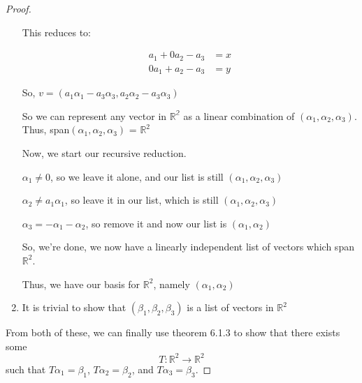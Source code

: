 \documentclass[12pt,letterpaper]{article}
\begin{document}
\begin{proof}
\begin{enumerate}
        This reduces to:

        \begin{align*}
          a_1 + 0a_2 - a_3 &= x \\
          0a_1 + a_2 - a_3 &= y
        \end{align*}

        So, $v = (a_1\alpha_1 - a_3\alpha_3, a_2\alpha_2 - a_3\alpha_3)$

        So we can represent any vector in $\mathbb{R^2}$ as a linear combination
        of $(\alpha_1, \alpha_2, \alpha_3)$.
        Thus, span$(\alpha_1, \alpha_2, \alpha_3)$ = $\mathbb{R}^2$

        Now, we start our recursive reduction.

        $\alpha_1 \neq 0$, so we leave it alone, and our list is still $(\alpha_1, \alpha_2, \alpha_3)$

        $\alpha_2 \neq a_1\alpha_1$, so leave it in our list, which is still $(\alpha_1, \alpha_2, \alpha_3)$

        $\alpha_3 = -\alpha_1 - \alpha_2$, so remove it and now our list is $(\alpha_1, \alpha_2)$

        So, we're done, we now have a linearly independent list of vectors which span $\mathbb{R}^2$.

        Thus, we have our basis for $\mathbb{R}^2$, namely $(\alpha_1, \alpha_2)$

      \item
        It is trivial to show that $(\beta_1, \beta_2, \beta_3)$ is a list of vectors in $\mathbb{R}^2$

    \end{enumerate}

    From both of these, we can finally use theorem 6.1.3 to show that there exists some
    \[T: \mathbb{R}^2 \rightarrow \mathbb{R}^2\]
    such that $T\alpha_1 = \beta_1$, $T\alpha_2 = \beta_2$, and $T\alpha_3 = \beta_3$.
  \end{proof}
\end{document}
